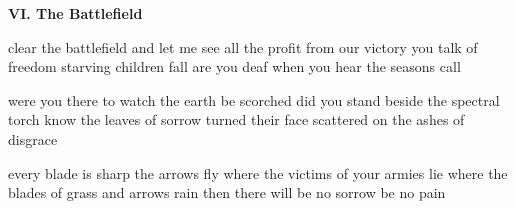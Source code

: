 \documentclass{article}
\renewcommand{\part}[1]{
  \begin{center}
    \textbf{#1}
  \end{center}
  \fontcream
}
\begin{document}
\part{VI. The Battlefield}

clear the battlefield and let me see
all the profit from our victory
you talk of freedom starving children fall
are you deaf when you hear the seasons call

were you there to watch the earth be scorched
did you stand beside the spectral torch
know the leaves of sorrow turned their face
scattered on the ashes of disgrace

every blade is sharp the arrows fly
where the victims of your armies lie
where the blades of grass and arrows rain
then there will be no sorrow
be no pain
\end{document}
